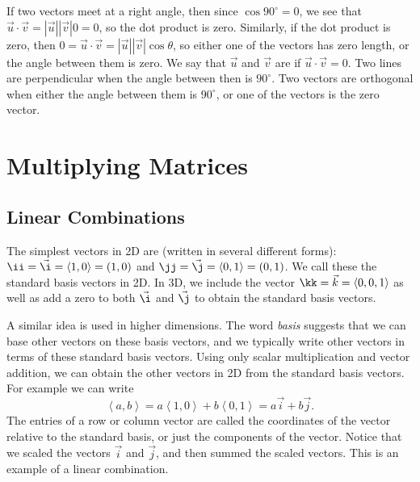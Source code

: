 If two vectors meet at a right angle, then since $\cos 90^\circ = 0$, we see that $\vec u \cdot \vec v = |\vec u||\vec v|0=0$, so the dot product is zero. 
Similarly, if the dot product is zero, then $0=\vec u \cdot \vec v = |\vec u||\vec v|\cos \theta$, so either one of the vectors has zero length, or the angle between them is zero. 
We say that $\vec u$ and $\vec v$ are  if $\vec u \cdot \vec v=0$. 
Two lines are perpendicular when the angle between then is $90^\circ$. Two vectors are orthogonal when either the angle between them is $90^\circ$, or one of the vectors is the zero vector.

\section{Multiplying Matrices}


\subsection{Linear Combinations}

The simplest vectors in 2D are (written in several different forms): 
$\ii = \vec \i = \left<1,0\right>=(1,0)$ and  
$\jj = \vec \j = \left<0,1\right>=(0,1)$. 
We call these the standard basis vectors in 2D. 
In 3D, we include the vector $\kk = \vec k=\left<0,0,1\right>$ as well as add a zero to both $\vec \i$ and $\vec \j$ to obtain the standard basis vectors. 

A similar idea is used in higher dimensions. 
The word \emph{basis} suggests that we can base other vectors on these basis vectors, and we typically write other vectors in terms of these standard basis vectors. 
Using only scalar multiplication and vector addition, we can obtain the other vectors in 2D from the standard basis vectors. 
For example we can write $$\left<a,b\right> =a\left<1,0\right>+b\left<0,1\right> = a\vec i+b\vec j.$$ 
The entries of a row or column vector are called the coordinates of the vector relative to the standard basis, or just the components of the vector. 
Notice that we scaled the vectors $\vec i$ and $\vec j$, and then summed the scaled vectors. 
This is an example of a linear combination.

